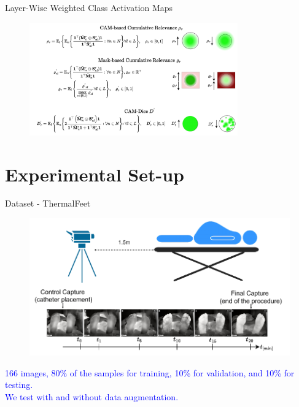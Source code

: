 \documentclass[aspectratio=169]{beamer}
\begin{document}
\begin{frame}{Layer-Wise Weighted Class Activation Maps}

\begin{figure}
    \centering
    \includegraphics[width=0.8\textwidth]{Figures/camMeasures.pdf}

\end{figure}

\end{frame}






\section{Experimental Set-up}

\begin{frame}{Dataset - ThermalFeet}
\begin{figure}
    \centering
    \includegraphics[width=0.7\linewidth]{Figures/camaraLocation.pdf}
\end{figure}
\begin{center}
    \textcolor{blue}{166 images, 80\% of the samples for training, 10\% for validation, and 10\% for testing.}\\ \textcolor{blue}{We test with and without data augmentation.}
\end{center}
\end{frame}
\end{document}
